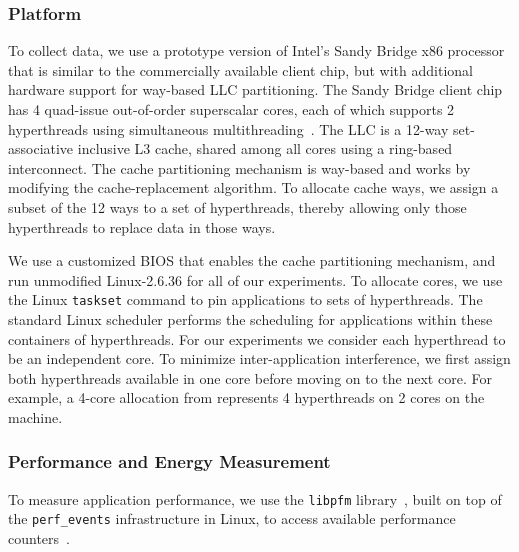 \subsubsection{Platform}

To collect data, we use a prototype version of Intel's Sandy Bridge x86 processor that is similar to the
commercially available client chip, but with additional hardware
support for way-based LLC partitioning.
The Sandy Bridge client chip has 4 quad-issue out-of-order
superscalar cores, each of which supports 2 hyperthreads using
simultaneous multithreading~\cite{IntelRefManual:2011}.
The LLC is a 12-way
set-associative  inclusive L3 cache, shared among all
cores using a ring-based interconnect.
The cache partitioning mechanism is way-based and works by modifying the
cache-replacement algorithm.  To allocate cache ways, we assign a subset of
the 12 ways to a set of hyperthreads, thereby allowing only those hyperthreads to replace data in those ways.


We use a customized BIOS that enables the cache partitioning
mechanism, and run unmodified Linux-2.6.36 for all of our experiments.
To allocate cores, we use the Linux \texttt{taskset} command to pin applications to
sets of hyperthreads. The standard Linux scheduler performs the scheduling for applications within these containers of hyperthreads. For our experiments we consider each hyperthread to be an independent core. To minimize inter-application interference, we first assign both hyperthreads available in one core before moving on to the next core. For example, a 4-core allocation from \pacora represents 4 hyperthreads on 2 cores on the machine.

\subsubsection{Performance and Energy Measurement}

To measure application performance, we use the \texttt{libpfm}
library~\cite{Eranian:OLS06,Perfmon2}, built on top of the
\texttt{perf\_events} infrastructure in Linux, to
access available performance counters~\cite{Intel:Manual2012}.

